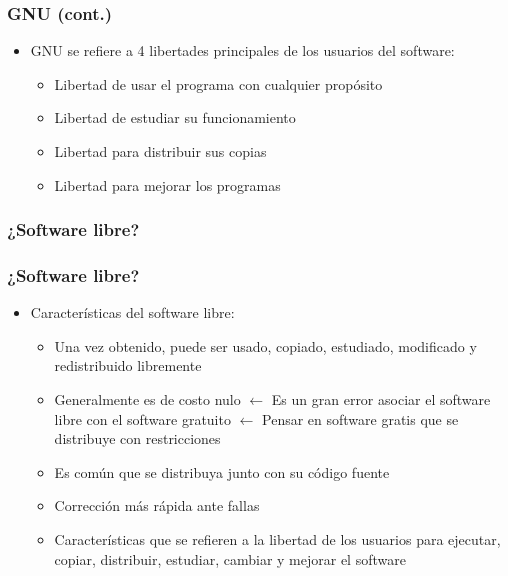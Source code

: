 \begin{frame}
	\frametitle{GNU (cont.)}
	\begin{itemize}
		\item GNU se refiere a 4 libertades principales de los usuarios del software:
		\begin{itemize}
			\item Libertad de usar el programa con cualquier propósito
			\item Libertad de estudiar su funcionamiento
			\item Libertad para distribuir sus copias
			\item Libertad para mejorar los programas
		\end{itemize}
	\end{itemize}
\end{frame}

\begin{frame}
	\frametitle{¿Software libre?}
	\begin{figure}
		\centering
	\end{figure}
\end{frame}

\begin{frame}
	\frametitle{¿Software libre?}
	\begin{itemize}
		\item Características del software libre:
		\begin{itemize}
			\item Una vez obtenido, puede ser usado, copiado, estudiado, modificado y redistribuido libremente
			\item Generalmente es de costo nulo $\leftarrow$ Es un gran error asociar el software libre con el software gratuito $\leftarrow$ Pensar en software gratis que se distribuye con restricciones
			\item Es común que se distribuya junto con su código fuente
			\item Corrección más rápida ante fallas
			\item Características que se refieren a la libertad de los usuarios para ejecutar, copiar, distribuir, estudiar, cambiar y mejorar el software
		\end{itemize}
	\end{itemize}
\end{frame}

